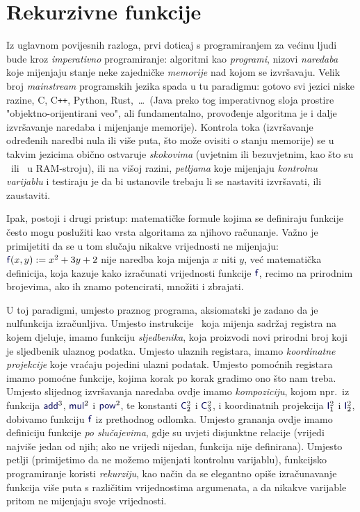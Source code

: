 \chapter{Rekurzivne funkcije}\label{ch:rek}

Iz uglavnom povijesnih razloga, prvi doticaj s programiranjem za većinu ljudi bude kroz \emph{imperativno} programiranje: algoritmi kao \emph{programi}, nizovi \emph{naredaba} koje mijenjaju stanje neke zajedničke \emph{memorije} nad kojom se izvršavaju. Velik broj \emph{mainstream} programskih jezika spada u tu paradigmu: gotovo svi jezici niske razine, C, C\texttt{++}, Python, Rust,~\ldots\ (Java preko tog imperativnog sloja prostire "objektno-orijentirani veo", ali fundamentalno, provođenje algoritma je i dalje izvršavanje naredaba i mijenjanje memorije). Kontrola toka (izvršavanje određenih naredbi nula ili više puta, što može ovisiti o stanju memorije) se u takvim jezicima obično ostvaruje \emph{skokovima} (uvjetnim ili bezuvjetnim, kao što su \dec\ ili \goto\ u RAM-stroju), ili na višoj razini, \emph{petljama} koje mijenjaju \emph{kontrolnu varijablu} i testiraju je da bi ustanovile trebaju li se nastaviti izvršavati, ili zaustaviti.

Ipak, postoji i drugi pristup: matematičke formule kojima se definiraju funkcije često mogu poslužiti kao vrsta algoritama za njihovo računanje. Važno je primijetiti da se u tom slučaju nikakve vrijednosti ne mijenjaju: $\f f(x,y):=x^2+3y+2$ nije naredba koja mijenja $x$ niti $y$, već matematička definicija, koja kazuje kako izračunati vrijednosti funkcije $\f f$, recimo na prirodnim brojevima, ako ih znamo potencirati, množiti i zbrajati.

U toj paradigmi, umjesto praznog programa, aksiomatski je zadano da je nulfunkcija izračunljiva. Umjesto instrukcije \inc\ koja mijenja sadržaj registra na kojem djeluje, imamo funkciju \emph{sljedbenika}, koja proizvodi novi prirodni broj koji je sljedbenik ulaznog podatka. Umjesto ulaznih registara, imamo \emph{koordinatne projekcije} koje vraćaju pojedini ulazni podatak. Umjesto pomoćnih registara imamo pomoćne funkcije, kojima korak po korak gradimo ono što nam treba. Umjesto slijednog izvršavanja naredaba ovdje imamo \emph{kompoziciju}, kojom npr.\ iz funkcija $\f{add}^3$, $\f{mul}^2$ i $\f{pow}^2$, te konstanti $\f C_2^2$ i $\f C_3^2$, i koordinatnih projekcija $\f I_1^2$ i $\f I_2^2$, dobivamo funkciju $\f f$ iz prethodnog odlomka. Umjesto grananja ovdje imamo definiciju funkcije \emph{po slučajevima}, gdje su uvjeti disjunktne relacije (vrijedi najviše jedan od njih; ako ne vrijedi nijedan, funkcija nije definirana). Umjesto petlji (primijetimo da ne možemo mijenjati kontrolnu varijablu), funkcijsko programiranje koristi \emph{rekurziju}, kao način da se elegantno opiše izračunavanje funkcija više puta s različitim vrijednostima argumenata, a da nikakve varijable pritom ne mijenjaju svoje vrijednosti. 

